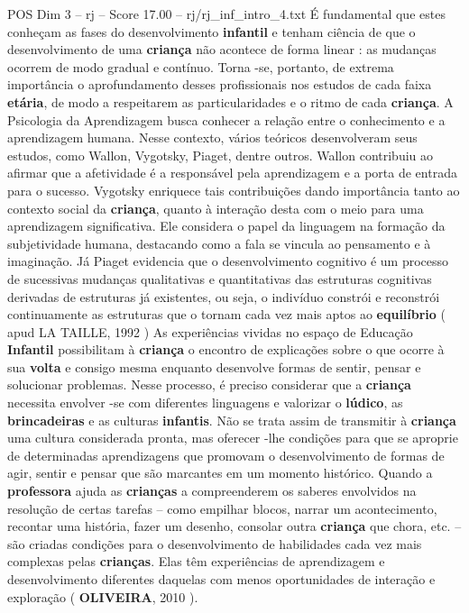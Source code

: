 \begin{textsample}{POS Dim 3 – rj – Score 17.00 – rj/rj\_inf\_intro\_4.txt}
É fundamental que estes conheçam as fases do desenvolvimento \textbf{infantil} e tenham ciência de que o desenvolvimento de uma \textbf{criança} não acontece de forma linear : as mudanças ocorrem de modo gradual e contínuo.
Torna -se, portanto, de extrema importância o aprofundamento desses profissionais nos estudos de cada faixa \textbf{etária}, de modo a respeitarem as particularidades e o ritmo de cada \textbf{criança}.
A Psicologia da Aprendizagem busca conhecer a relação entre o conhecimento e a aprendizagem humana.
Nesse contexto, vários teóricos desenvolveram seus estudos, como Wallon, Vygotsky, Piaget, dentre outros.
Wallon contribuiu ao afirmar que a afetividade é a responsável pela aprendizagem e a porta de entrada para o sucesso.
Vygotsky enriquece tais contribuições dando importância tanto ao contexto social da \textbf{criança}, quanto à interação desta com o meio para uma aprendizagem significativa.
Ele considera o papel da linguagem na formação da subjetividade humana, destacando como a fala se vincula ao pensamento e à imaginação.
Já Piaget evidencia que o desenvolvimento cognitivo é um processo de sucessivas mudanças qualitativas e quantitativas das estruturas cognitivas derivadas de estruturas já existentes, ou seja, o indivíduo constrói e reconstrói continuamente as estruturas que o tornam cada vez mais aptos ao \textbf{equilíbrio} ( apud LA TAILLE, 1992 ) As experiências vividas no espaço de Educação \textbf{Infantil} possibilitam à \textbf{criança} o encontro de explicações sobre o que ocorre à sua \textbf{volta} e consigo mesma enquanto desenvolve formas de sentir, pensar e solucionar problemas.
Nesse processo, é preciso considerar que a \textbf{criança} necessita envolver -se com diferentes linguagens e valorizar o \textbf{lúdico}, as \textbf{brincadeiras} e as culturas \textbf{infantis}.
Não se trata assim de transmitir à \textbf{criança} uma cultura considerada pronta, mas oferecer -lhe condições para que se aproprie de determinadas aprendizagens que promovam o desenvolvimento de formas de agir, sentir e pensar que são marcantes em um momento histórico.
Quando a \textbf{professora} ajuda as \textbf{crianças} a compreenderem os saberes envolvidos na resolução de certas tarefas – como empilhar blocos, narrar um acontecimento, recontar uma história, fazer um desenho, consolar outra \textbf{criança} que chora, etc. – são criadas condições para o desenvolvimento de habilidades cada vez mais complexas pelas \textbf{crianças}.
Elas têm experiências de aprendizagem e desenvolvimento diferentes daquelas com menos oportunidades de interação e exploração ( \textbf{OLIVEIRA}, 2010 ).

\end{textsample}
